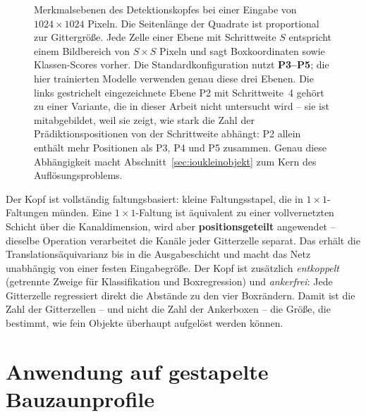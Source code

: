 \begin{figure}[htbp]
\caption[Merkmalsebenen des Detektionskopfes]{Merkmalsebenen des
Detektionskopfes bei einer Eingabe von $1024\times1024$ Pixeln. Die
Seitenlänge der Quadrate ist proportional zur Gittergröße. Jede Zelle einer
Ebene mit Schrittweite $S$ entspricht einem Bildbereich von $S \times S$ Pixeln
und sagt Boxkoordinaten sowie Klassen-Scores vorher. Die Standardkonfiguration
nutzt \textbf{P3--P5}; die hier trainierten Modelle verwenden genau diese drei
Ebenen. Die links gestrichelt eingezeichnete Ebene P2 mit Schrittweite~4 gehört
zu einer Variante, die in dieser Arbeit nicht untersucht wird -- sie ist
mitabgebildet, weil sie zeigt, wie stark die Zahl der Prädiktionspositionen von
der Schrittweite abhängt: P2 allein enthält mehr Positionen als P3, P4 und P5
zusammen. Genau diese Abhängigkeit macht Abschnitt~\ref{sec:ioukleinobjekt} zum
Kern des Auflösungsproblems.}
\label{abb:pyramide}
\end{figure}

 Der Kopf ist vollständig faltungsbasiert: kleine
Faltungsstapel, die in $1\times1$-Faltungen münden. Eine $1\times1$-Faltung ist
äquivalent zu einer vollvernetzten Schicht über die Kanaldimension, wird aber
\textbf{positionsgeteilt} angewendet -- dieselbe Operation verarbeitet die Kanäle
jeder Gitterzelle separat. Das erhält die Translationsäquivarianz bis in die
Ausgabeschicht und macht das Netz unabhängig von einer festen Eingabegröße. Der
Kopf ist zusätzlich
\emph{entkoppelt} (getrennte Zweige für Klassifikation und Boxregression) und
\emph{ankerfrei}: Jede Gitterzelle regressiert direkt die Abstände zu den vier
Boxrändern. Damit ist die Zahl der Gitterzellen -- und nicht die Zahl der
Ankerboxen -- die Größe, die bestimmt, wie fein Objekte überhaupt aufgelöst
werden können.

\section{Anwendung auf gestapelte Bauzaunprofile}
\label{sec:anwendung}

